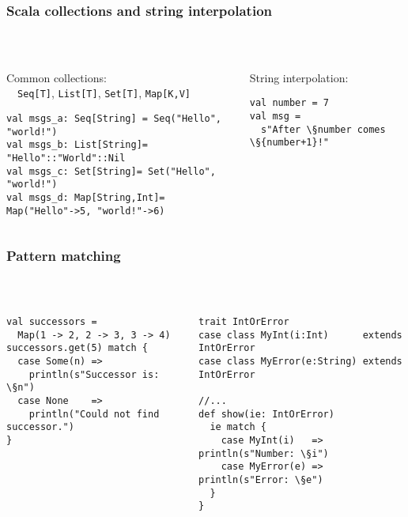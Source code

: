 \documentclass[aspectratio=169]{beamer}
\begin{document}
\begin{frame}[fragile]\frametitle{Scala collections and string interpolation}
~\\[-8mm]
\begin{columns}
\begin{column}{0.46\textwidth}
Common collections:
\\~~\texttt{Seq[T]}, \texttt{List[T]}, \texttt{Set[T]}, \texttt{Map[K,V]}  
\begin{lstlisting}
val msgs_a: Seq[String] = Seq("Hello", "world!")
val msgs_b: List[String]= "Hello"::"World"::Nil
val msgs_c: Set[String]= Set("Hello", "world!")
val msgs_d: Map[String,Int]= Map("Hello"->5, "world!"->6)
\end{lstlisting}
\end{column}
\begin{column}{0.52\textwidth}
String interpolation:
\begin{lstlisting}
val number = 7
val msg =
  s"After \§number comes \§{number+1}!"
\end{lstlisting}
\end{column}
\end{columns}
\end{frame}


\begin{frame}[fragile]\frametitle{Pattern matching}
~\\[-8mm]
\begin{columns}
\begin{column}{0.56\textwidth}
\begin{lstlisting}
val successors =
  Map(1 -> 2, 2 -> 3, 3 -> 4)
successors.get(5) match {
  case Some(n) =>
    println(s"Successor is: \§n")
  case None    =>
    println("Could not find successor.")
}
\end{lstlisting}
\end{column}
\begin{column}{0.42\textwidth}
\begin{lstlisting}
trait IntOrError
case class MyInt(i:Int)      extends IntOrError
case class MyError(e:String) extends IntOrError

//...
def show(ie: IntOrError)
  ie match {
    case MyInt(i)   => println(s"Number: \§i")
    case MyError(e) => println(s"Error: \§e")
  }
}
\end{lstlisting}
\end{column}
\end{columns}
\end{frame}
\end{document}
